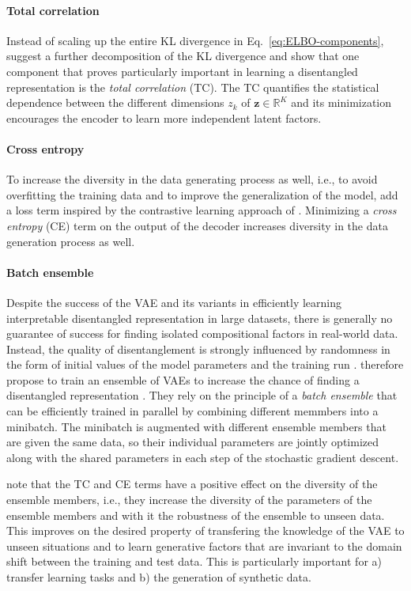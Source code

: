 \documentclass[english,a4paper,10pt]{scrartcl}
\begin{document}
\paragraph{Total correlation}
Instead of scaling up the entire KL divergence in Eq.~\eqref{eq:ELBO-components}, \citet{Chen.Li.ea.2018} suggest a further decomposition of the KL divergence and show that one component that proves particularly important in learning a disentangled representation is the \emph{total correlation} (TC). The TC quantifies the statistical dependence between the different dimensions $z_{k}$ of $\mathbf{z}\in\mathbb{R}^{K}$ and its minimization encourages the encoder to learn more independent latent factors.

\paragraph{Cross entropy}
To increase the diversity in the data generating process as well, i.e., to avoid overfitting the training data and to improve the generalization of the model, \cite{Groth.Chavez.2023} add a loss term inspired by the contrastive learning approach of \citet{Radford.Kim.ea.2021}. Minimizing a \emph{cross entropy} (CE) term on the output of the decoder increases diversity in the data generation process as well.

\paragraph{Batch ensemble}
Despite the success of the VAE and its variants in efficiently learning interpretable disentangled representation in large datasets, there is generally no guarantee of success for finding isolated compositional factors in real-world data. Instead, the quality of disentanglement is strongly influenced by randomness in the form of initial values of the model parameters and the training run \citep{Locatello.Bauer.ea.2019}. \cite{Groth.Chavez.2023} therefore propose to train an ensemble of VAEs to increase the chance of finding a disentangled representation \citep{Duan.Matthey.ea.2020}. They rely on the principle of a \emph{batch ensemble} \citep{Wen.Tran.ea.2020} that can be efficiently trained in parallel by combining different memmbers into a minibatch. The minibatch is augmented with different ensemble members that are given the same data, so their individual parameters are jointly optimized along with the shared parameters in each step of the stochastic gradient descent.

\cite{Groth.Chavez.2023} note that the TC and CE terms have a positive effect on the diversity of the ensemble members, i.e., they increase the diversity of the parameters of the ensemble members and with it the robustness of the ensemble to unseen data. This improves on the desired property of transfering the knowledge of the VAE to unseen
situations and to learn generative factors that are invariant to the domain shift between the training and test data. This is particularly important for a) transfer learning tasks and b) the generation of synthetic data.
\end{document}
